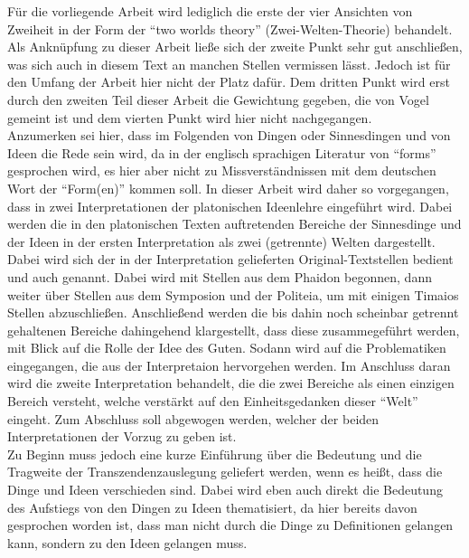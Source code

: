 Für die vorliegende Arbeit wird lediglich die erste der vier Ansichten von Zweiheit in der Form der \enquote{two worlds theory} (Zwei-Welten-Theorie) behandelt. Als Anknüpfung zu dieser Arbeit ließe sich der zweite Punkt sehr gut anschließen, was sich auch in diesem Text an manchen Stellen vermissen lässt. Jedoch ist für den Umfang der Arbeit hier nicht der Platz dafür. Dem dritten Punkt wird erst durch den zweiten Teil dieser Arbeit die Gewichtung gegeben, die von Vogel gemeint ist und dem vierten Punkt wird hier nicht nachgegangen.\\
Anzumerken sei hier, dass im Folgenden von Dingen oder Sinnesdingen und von Ideen die Rede sein wird, da in der englisch sprachigen Literatur von \enquote{forms} gesprochen wird, es hier aber nicht zu Missverständnissen mit dem deutschen Wort der \enquote{Form(en)} kommen soll. 
In dieser Arbeit wird daher so vorgegangen, dass in zwei Interpretationen der platonischen Ideenlehre eingeführt wird. Dabei werden die in den platonischen Texten auftretenden Bereiche der Sinnesdinge und der Ideen in der ersten Interpretation als zwei (getrennte) Welten dargestellt. Dabei wird sich der in der Interpretation gelieferten Original-Textstellen bedient und auch genannt. Dabei wird mit Stellen aus dem Phaidon begonnen, dann weiter über Stellen aus dem Symposion und der Politeia, um mit einigen Timaios Stellen abzuschließen. Anschließend werden die bis dahin noch scheinbar getrennt gehaltenen Bereiche dahingehend klargestellt, dass diese zusammegeführt werden, mit Blick auf die Rolle der Idee des Guten. Sodann wird auf die Problematiken eingegangen, die aus der Interpretaion hervorgehen werden. Im Anschluss daran wird die zweite Interpretation behandelt, die die zwei Bereiche als einen einzigen Bereich versteht, welche verstärkt auf den Einheitsgedanken dieser \enquote{Welt} eingeht. Zum Abschluss soll abgewogen werden, welcher der beiden Interpretationen der Vorzug zu geben ist.\\
Zu Beginn muss jedoch eine kurze Einführung über die Bedeutung und die Tragweite der Transzendenzauslegung geliefert werden, wenn es heißt, dass die Dinge und Ideen verschieden sind. Dabei wird eben auch direkt die Bedeutung des Aufstiegs von den Dingen zu Ideen thematisiert, da hier bereits davon gesprochen worden ist, dass man nicht durch die Dinge zu Definitionen gelangen kann, sondern zu den Ideen gelangen muss.
